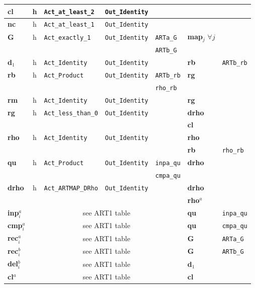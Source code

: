 {\begin{tabular}{|l|c|l|l|l||l|l|}
\hline
%
{\bf cl} & h & {\tt Act\_at\_least\_2} & {\tt Out\_Identity}  & & & \\ 
\hline
%
{\bf nc} & h & {\tt Act\_at\_least\_1} & {\tt Out\_Identity}  & & & \\ 
\hline
%
{\bf G} & h & {\tt Act\_exactly\_1} & {\tt Out\_Identity}  & {\tt ARTa\_G} &
             {\bf map}$_{j}$ $\forall j$ & \\ 
& & & & {\tt ARTb\_G} & & \\ 
\hline
%
{\bf d}$_1$  & h & {\tt Act\_Identity}  & {\tt Out\_Identity}  & & {\bf rb} & {\tt ARTb\_rb} \\ 
\hline
%
{\bf rb} & h & {\tt Act\_Product} & {\tt Out\_Identity}  & {\tt ARTb\_rb} & {\bf rg} & \\ 
& & & & {\tt rho\_rb} & & \\ 
\hline
%
{\bf rm} & h & {\tt Act\_Identity}  & {\tt Out\_Identity}  & & {\bf rg} & \\ 
\hline
%
{\bf rg} & h & {\tt Act\_less\_than\_0} & {\tt Out\_Identity}  & & {\bf drho} & \\ 
& & & & & {\bf cl} & \\ 
\hline
%
{\bf rho} & h & {\tt Act\_Identity}  & {\tt Out\_Identity}  & & {\bf rho} & \\ 
& & & & & {\bf rb} & {\tt rho\_rb} \\ 
\hline
%
{\bf qu} & h & {\tt Act\_Product} & {\tt Out\_Identity}  & {\tt inpa\_qu} &
        {\bf drho} & \\ 
& & & & {\tt cmpa\_qu} & & \\ 
\hline
%
{\bf drho} & h & {\tt Act\_ARTMAP\_DRho} & {\tt Out\_Identity}  & & {\bf drho} & \\ 
& & & & & {\bf rho$^a$} & \\ 
\hline
%
{\bf inp}$_{i}^a$ & \multicolumn{4}{|c||}{see ART1 table} & {\bf qu} &
            {\tt inpa\_qu} \hspace*{8mm} \\ 
\hline
%
{\bf cmp}$_{i}^a$ & \multicolumn{4}{|c||}{see ART1 table} & {\bf qu} &
            {\tt cmpa\_qu} \\ 
\hline
%
{\bf rec}$_{i}^a$ & \multicolumn{4}{|c||}{see ART1 table} &  {\bf G} &
            {\tt ARTa\_G} \\ 
\hline
%
{\bf rec}$_{i}^b$ & \multicolumn{4}{|c||}{see ART1 table} &  {\bf G} &
            {\tt ARTb\_G} \\ 
\hline
%
{\bf del}$_{i}^b$ & \multicolumn{4}{|c||}{see ART1 table} &  {\bf d}$_1$  &  \\ 
\hline
%
{\bf cl}$^a$  & \multicolumn{4}{|c||}{see ART1 table} &  {\bf cl} & \\ 

\end{tabular}}
